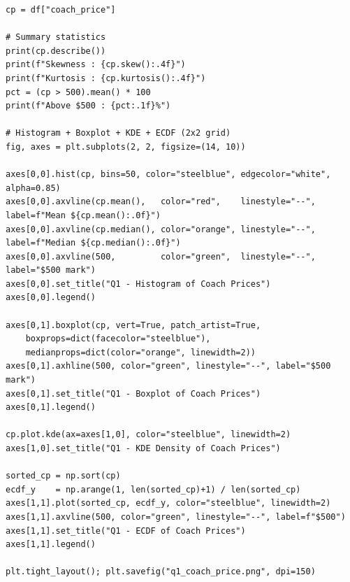 \documentclass[12pt, a4paper]{report}
\begin{document}
\begin{lstlisting}[style=python, caption={Python — Summary statistics and visualisation for coach price}]
cp = df["coach_price"]

# Summary statistics
print(cp.describe())
print(f"Skewness : {cp.skew():.4f}")
print(f"Kurtosis : {cp.kurtosis():.4f}")
pct = (cp > 500).mean() * 100
print(f"Above $500 : {pct:.1f}%")

# Histogram + Boxplot + KDE + ECDF (2x2 grid)
fig, axes = plt.subplots(2, 2, figsize=(14, 10))

axes[0,0].hist(cp, bins=50, color="steelblue", edgecolor="white", alpha=0.85)
axes[0,0].axvline(cp.mean(),   color="red",    linestyle="--", label=f"Mean ${cp.mean():.0f}")
axes[0,0].axvline(cp.median(), color="orange", linestyle="--", label=f"Median ${cp.median():.0f}")
axes[0,0].axvline(500,         color="green",  linestyle="--", label="$500 mark")
axes[0,0].set_title("Q1 - Histogram of Coach Prices")
axes[0,0].legend()

axes[0,1].boxplot(cp, vert=True, patch_artist=True,
    boxprops=dict(facecolor="steelblue"),
    medianprops=dict(color="orange", linewidth=2))
axes[0,1].axhline(500, color="green", linestyle="--", label="$500 mark")
axes[0,1].set_title("Q1 - Boxplot of Coach Prices")
axes[0,1].legend()

cp.plot.kde(ax=axes[1,0], color="steelblue", linewidth=2)
axes[1,0].set_title("Q1 - KDE Density of Coach Prices")

sorted_cp = np.sort(cp)
ecdf_y    = np.arange(1, len(sorted_cp)+1) / len(sorted_cp)
axes[1,1].plot(sorted_cp, ecdf_y, color="steelblue", linewidth=2)
axes[1,1].axvline(500, color="green", linestyle="--", label=f"$500")
axes[1,1].set_title("Q1 - ECDF of Coach Prices")
axes[1,1].legend()

plt.tight_layout(); plt.savefig("q1_coach_price.png", dpi=150)
\end{lstlisting}
\end{document}
